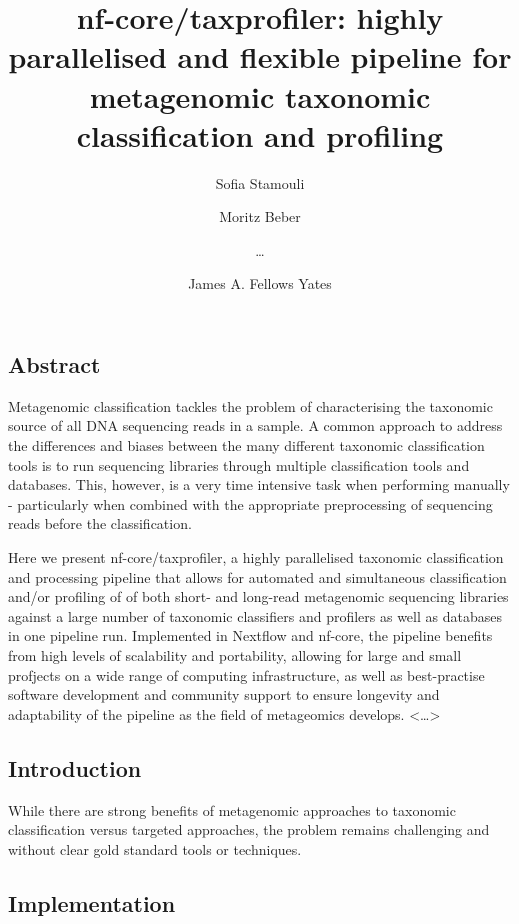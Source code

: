 \documentclass[
]{article}
\title{nf-core/taxprofiler: highly parallelised and flexible pipeline
for metagenomic taxonomic classification and profiling}
\author{Sofia Stamouli}
\affil{%
                  Karolinkska Institutet
              }
\author{Moritz Beber}
\affil{%
                  UnSeen Bio
              }
\author{\ldots{}}
\author{James A. Fellows Yates}
\affil{%
                  Max Planck Institute for Evolutionary Anthropology
              }
\date{}
\begin{document}
\maketitle
\ifdefined\Shaded\renewenvironment{Shaded}{\begin{tcolorbox}[sharp corners, frame hidden, enhanced, boxrule=0pt, interior hidden, borderline west={3pt}{0pt}{shadecolor}, breakable]}{\end{tcolorbox}}\fi

\hypertarget{abstract}{%
\subsection{Abstract}\label{abstract}}

Metagenomic classification tackles the problem of characterising the
taxonomic source of all DNA sequencing reads in a sample. A common
approach to address the differences and biases between the many
different taxonomic classification tools is to run sequencing libraries
through multiple classification tools and databases. This, however, is a
very time intensive task when performing manually - particularly when
combined with the appropriate preprocessing of sequencing reads before
the classification.

Here we present nf-core/taxprofiler, a highly parallelised taxonomic
classification and processing pipeline that allows for automated and
simultaneous classification and/or profiling of of both short- and
long-read metagenomic sequencing libraries against a large number of
taxonomic classifiers and profilers as well as databases in one pipeline
run. Implemented in Nextflow and nf-core, the pipeline benefits from
high levels of scalability and portability, allowing for large and small
profjects on a wide range of computing infrastructure, as well as
best-practise software development and community support to ensure
longevity and adaptability of the pipeline as the field of metageomics
develops. \textless\ldots\textgreater{}

\hypertarget{introduction}{%
\subsection{Introduction}\label{introduction}}

While there are strong benefits of metagenomic approaches to taxonomic
classification versus targeted approaches, the problem remains
challenging and without clear gold standard tools or techniques.

\hypertarget{implementation}{%
\subsection{Implementation}\label{implementation}}
\end{document}

